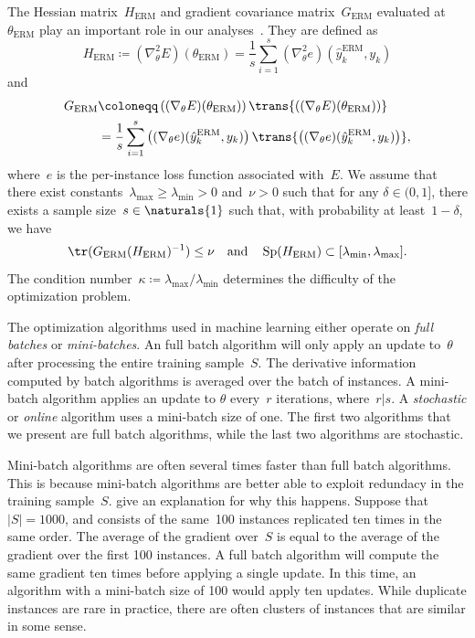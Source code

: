\documentclass[11pt,a4paper]{article}
\numberwithin{equation}{section}
\begin{document}
The Hessian matrix~$H_{\text{ERM}}$ and gradient covariance
matrix~$G_{\text{ERM}}$ evaluated at~$\theta_{\text{ERM}}$ play an important
role in our analyses~\citep{bousquet2008tradeoffs}. They are defined as
\[
	H_{\text{ERM}} \coloneqq (\nabla_\theta^2 E)(\theta_{\text{ERM}})
	= \frac{1}{s} \sum_{i = 1}^s (\nabla_\theta^2 e)(\hat{y}_k^{\text{ERM}}, y_k)
\]
and
\begin{align*}
	G_{\text{ERM}}
	&\coloneqq \left((\nabla_\theta E)(\theta_{\text{ERM}})\right)
		\trans{\left((\nabla_\theta E)(\theta_{\text{ERM}})\right)} \\
	&= \frac{1}{s} \sum_{i = 1}^s
		\left((\nabla_\theta e)(\hat{y}_k^{\text{ERM}}, y_k)\right)
		\trans{\left((\nabla_\theta e)(\hat{y}_k^{\text{ERM}}, y_k)\right)},
\end{align*}
where~$e$ is the per-instance loss function associated with~$E$. We assume that
there exist constants~$\lambda_{\text{max}} \geq \lambda_{\text{min}} > 0$
and~$\nu > 0$ such that for any $\delta \in (0, 1]$, there exists a sample
size~$s \in \naturals{1}$ such that, with probability at least~$1 - \delta$, we
have
\[
	\tr(G_{\text{ERM}} (H_{\text{ERM}})^{-1}) \leq \nu \quad\text{and}\quad
	\operatorname{Sp}(H_{\text{ERM}}) \subset [\lambda_{\text{min}}, \lambda_{\text{max}}].
\]
The condition number~$\kappa \coloneqq
\lambda_{\text{max}}/{\lambda_{\text{min}}}$ determines the difficulty of the
optimization problem.

The optimization algorithms used in machine learning either operate on
\emph{full batches} or \emph{mini-batches}. An full batch algorithm will only
apply an update to~$\theta$ after processing the entire training sample~$S$. The
derivative information computed by batch algorithms is averaged over the batch
of instances. A mini-batch algorithm applies an update to $\theta$ every~$r$
iterations, where~$r | s$. A \emph{stochastic} or \emph{online} algorithm uses a
mini-batch size of one. The first two algorithms that we present are full batch
algorithms, while the last two algorithms are stochastic.

Mini-batch algorithms are often several times faster than full batch algorithms.
This is because mini-batch algorithms are better able to exploit redundacy in
the training sample~$S$. \citet{lecun-98b} give an explanation for why this
happens. Suppose that~$|S| = 1000$, and consists of the same~100 instances
replicated ten times in the same order. The average of the gradient over~$S$ is
equal to the average of the gradient over the first 100 instances. A full batch
algorithm will compute the same gradient ten times before applying a single
update. In this time, an algorithm with a mini-batch size of 100 would apply ten
updates. While duplicate instances are rare in practice, there are often
clusters of instances that are similar in some sense.
\end{document}
